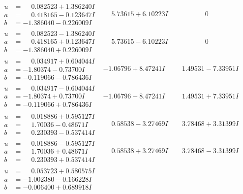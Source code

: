 \documentclass[1p]{elsarticle_modified}
\theoremstyle{definition}
\begin{document}
$$\begin{array}{c|c|c}
\begin{aligned}
u &= \phantom{-}0.082523 + 1.386240 I \\
a &= \phantom{-}0.418165 - 0.123647 I \\
b &= -1.386040 - 0.226009 I\end{aligned}
 & \phantom{-}5.73615 + 6.10223 I & \phantom{-0.000000 } 0 \\ \hline\begin{aligned}
u &= \phantom{-}0.082523 - 1.386240 I \\
a &= \phantom{-}0.418165 + 0.123647 I \\
b &= -1.386040 + 0.226009 I\end{aligned}
 & \phantom{-}5.73615 - 6.10223 I & \phantom{-0.000000 } 0 \\ \hline\begin{aligned}
u &= \phantom{-}0.034917 + 0.604044 I \\
a &= -1.80374 - 0.73700 I \\
b &= -0.119066 - 0.786436 I\end{aligned}
 & -1.06796 + 8.47241 I & \phantom{-}1.49531 - 7.33951 I \\ \hline\begin{aligned}
u &= \phantom{-}0.034917 - 0.604044 I \\
a &= -1.80374 + 0.73700 I \\
b &= -0.119066 + 0.786436 I\end{aligned}
 & -1.06796 - 8.47241 I & \phantom{-}1.49531 + 7.33951 I \\ \hline\begin{aligned}
u &= \phantom{-}0.018886 + 0.595127 I \\
a &= \phantom{-}1.70036 - 0.48671 I \\
b &= \phantom{-}0.230393 - 0.537414 I\end{aligned}
 & \phantom{-}0.58538 - 3.27469 I & \phantom{-}3.78468 + 3.31399 I \\ \hline\begin{aligned}
u &= \phantom{-}0.018886 - 0.595127 I \\
a &= \phantom{-}1.70036 + 0.48671 I \\
b &= \phantom{-}0.230393 + 0.537414 I\end{aligned}
 & \phantom{-}0.58538 + 3.27469 I & \phantom{-}3.78468 - 3.31399 I \\ \hline\begin{aligned}
u &= \phantom{-}0.053723 + 0.580575 I \\
a &= -1.002380 - 0.166228 I \\
b &= -0.006400 + 0.689918 I\end{aligned}

\end{array}$$
\end{document}
